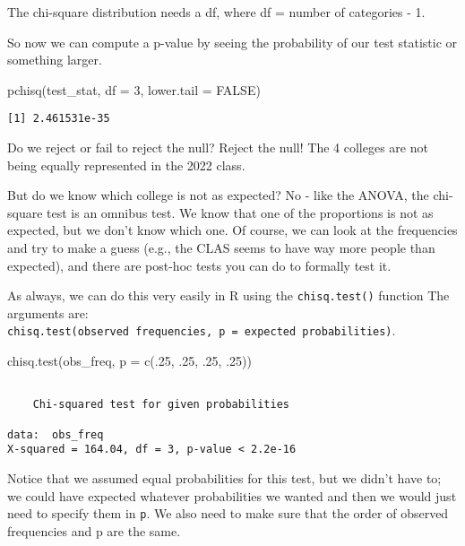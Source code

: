 \documentclass[
  letterpaper,
  DIV=11,
  numbers=noendperiod]{scrartcl}
\newenvironment{Shaded}{\begin{snugshade}}{\end{snugshade}}
\newcommand{\AttributeTok}[1]{\textcolor[rgb]{0.40,0.45,0.13}{#1}}
\newcommand{\ConstantTok}[1]{\textcolor[rgb]{0.56,0.35,0.01}{#1}}
\newcommand{\DecValTok}[1]{\textcolor[rgb]{0.68,0.00,0.00}{#1}}
\newcommand{\FunctionTok}[1]{\textcolor[rgb]{0.28,0.35,0.67}{#1}}
\newcommand{\NormalTok}[1]{\textcolor[rgb]{0.00,0.23,0.31}{#1}}
\begin{document}
The chi-square distribution needs a df, where df = number of categories
- 1.

So now we can compute a p-value by seeing the probability of our test
statistic or something larger.

\begin{Shaded}
\begin{Highlighting}[]
\FunctionTok{pchisq}\NormalTok{(test\_stat, }\AttributeTok{df =} \DecValTok{3}\NormalTok{, }\AttributeTok{lower.tail =} \ConstantTok{FALSE}\NormalTok{)}
\end{Highlighting}
\end{Shaded}

\begin{verbatim}
[1] 2.461531e-35
\end{verbatim}

Do we reject or fail to reject the null? Reject the null! The 4 colleges
are not being equally represented in the 2022 class.

But do we know which college is not as expected? No - like the ANOVA,
the chi-square test is an omnibus test. We know that one of the
proportions is not as expected, but we don't know which one. Of course,
we can look at the frequencies and try to make a guess (e.g., the CLAS
seems to have way more people than expected), and there are post-hoc
tests you can do to formally test it.

As always, we can do this very easily in R using the
\texttt{chisq.test()} function The arguments are:
\texttt{chisq.test(observed\ frequencies,\ p\ =\ expected\ probabilities)}.

\begin{Shaded}
\begin{Highlighting}[]
\FunctionTok{chisq.test}\NormalTok{(obs\_freq, }\AttributeTok{p =} \FunctionTok{c}\NormalTok{(.}\DecValTok{25}\NormalTok{, .}\DecValTok{25}\NormalTok{, .}\DecValTok{25}\NormalTok{, .}\DecValTok{25}\NormalTok{))}
\end{Highlighting}
\end{Shaded}

\begin{verbatim}

    Chi-squared test for given probabilities

data:  obs_freq
X-squared = 164.04, df = 3, p-value < 2.2e-16
\end{verbatim}

Notice that we assumed equal probabilities for this test, but we didn't
have to; we could have expected whatever probabilities we wanted and
then we would just need to specify them in \texttt{p}. We also need to
make sure that the order of observed frequencies and p are the same.
\end{document}
